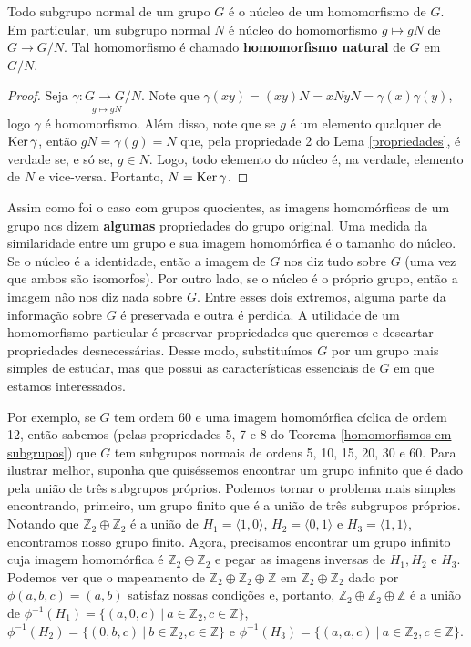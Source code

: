 	\begin{theorem}
	\label{subgrupos normais e nucleos}
		Todo subgrupo normal de um grupo $G$ é o núcleo de um homomorfismo de $G$. Em particular, um subgrupo normal $N$ é núcleo do homomorfismo $g\mapsto gN$ de $G\to G/N$. Tal homomorfismo é chamado \textbf{homomorfismo natural} de $G$ em $G/N$.
	\end{theorem}
	\begin{proof}
		Seja $\displaystyle{ \underset{g\mapsto gN}{\gamma : G\to G/N }}$. Note que 
		$\gamma(xy) = (xy)N = xNyN = \gamma(x)\gamma(y)$, logo $\gamma$ é homomorfismo. 
		Além disso, note que se $g$ é um elemento qualquer de $\operatorname{Ker}\gamma$, então $gN = \gamma(g) = N$ que, 
		pela propriedade 2 do Lema \ref{propriedades}, é verdade se, e só se, $g\in N$. Logo, 
		todo elemento do núcleo é, na verdade, elemento de $N$ e vice-versa. Portanto, $N = \operatorname{Ker}\gamma$.
	\end{proof}
	Assim como foi o caso com grupos quocientes, as imagens homomórficas de um grupo 
	nos dizem \textbf{algumas} propriedades do grupo original. Uma medida da similaridade entre um grupo 
	e sua imagem homomórfica é o tamanho do núcleo. Se o núcleo é a identidade, então a imagem de $G$ 
	nos diz tudo sobre $G$ (uma vez que ambos são isomorfos). Por outro lado, se o núcleo é o próprio grupo, 
	então a imagem não nos diz nada sobre $G$. Entre esses dois extremos, alguma parte da informação sobre 
	$G$ é preservada e outra é perdida. A utilidade de um homomorfismo particular é preservar propriedades 
	que queremos e descartar propriedades desnecessárias. Desse modo, substituímos $G$ por um grupo mais 
	simples de estudar, mas que possui as características essenciais de $G$ em que estamos interessados.
	\begin{example}
	Por exemplo, se $G$ tem ordem 60 e uma imagem homomórfica cíclica de ordem 12, então
	sabemos (pelas propriedades 5, 7 e 8 do Teorema \ref{homomorfismos em subgrupos}) que $G$ tem subgrupos
	normais de ordens 5, 10, 15, 20, 30 e 60. Para ilustrar melhor, suponha que quiséssemos encontrar um grupo
	infinito que é dado pela união de três subgrupos próprios. Podemos tornar o problema mais simples encontrando,
	primeiro, um grupo finito que é a união de três subgrupos próprios. Notando que
	$\mathbb{Z}_2\oplus\mathbb{Z}_2$ é a união de $H_1 = \langle 1,0 \rangle$, $H_2 = \langle 0,1 \rangle$ e 
	$H_3 = \langle 1,1 \rangle$, encontramos nosso grupo finito. Agora, precisamos encontrar um grupo infinito
	cuja imagem homomórfica é $\mathbb{Z}_2\oplus\mathbb{Z}_2$ e pegar as imagens inversas de $H_1, H_2$ e $H_3$.
	Podemos ver que o mapeamento de $\mathbb{Z}_2\oplus\mathbb{Z}_2\oplus\mathbb{Z}$ em
	$\mathbb{Z}_2\oplus\mathbb{Z}_2$ dado por $\phi(a,b,c) = (a,b)$ satisfaz nossas condições e, portanto,
	$\mathbb{Z}_2\oplus\mathbb{Z}_2\oplus\mathbb{Z}$ é a união de 
	$\phi^{-1}(H_1) = \{ (a,0,c) \ | \ a\in\mathbb{Z}_2, c\in\mathbb{Z} \}$, $\phi^{-1}(H_2) 
	= \{ (0,b,c) \ | \ b\in\mathbb{Z}_2, c\in\mathbb{Z} \}$ e 
	$\phi^{-1}(H_3) = \{ (a,a,c) \ | \ a\in\mathbb{Z}_2, c\in\mathbb{Z} \}$.
	\end{example}
